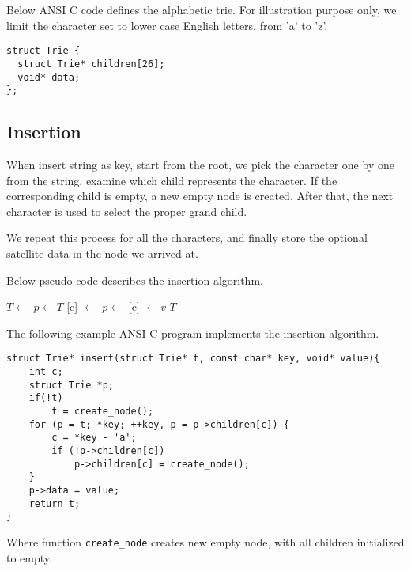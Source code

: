 \documentclass{article}
\begin{document}
Below ANSI C code defines the alphabetic trie. For illustration purpose only,
we limit the character set to lower case English letters, from 'a' to 'z'.

\lstset{language=C}
\begin{lstlisting}
struct Trie {
  struct Trie* children[26];
  void* data;
};
\end{lstlisting}


\subsection{Insertion}

When insert string as key, start from the root, we pick the character
one by one from the string, examine which child represents the character.
If the corresponding child is empty, a new empty node is created.
After that, the next character is used to select the proper grand child.

We repeat this process for all the characters, and finally store the
optional satellite data in the node we arrived at.

Below pseudo code describes the insertion algorithm.

\begin{algorithmic}[1]
    \State $T \gets $ 
  \EndIf
  \State $p \gets T$
      \State {}[c] $\gets$ 
    \EndIf
    \State $p \gets $ [c]
  \EndFor
  \State {} $\gets v$
  \State \Return $T$
\EndFunction
\end{algorithmic}

The following example ANSI C program implements the insertion algorithm.

\lstset{language=C}
\begin{lstlisting}
struct Trie* insert(struct Trie* t, const char* key, void* value){
    int c;
    struct Trie *p;
    if(!t)
        t = create_node();
    for (p = t; *key; ++key, p = p->children[c]) {
        c = *key - 'a';
        if (!p->children[c])
            p->children[c] = create_node();
    }
    p->data = value;
    return t;
}
\end{lstlisting}

Where function \texttt{create\_node} creates new empty node, with all
children initialized to empty.
\end{document}

